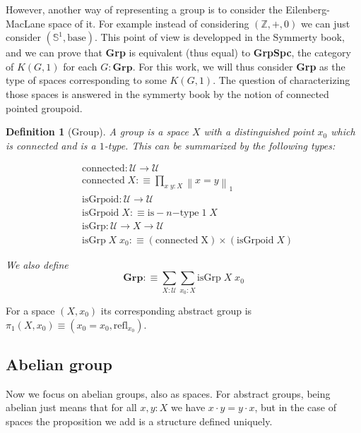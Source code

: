 \documentclass{article}
\newtheorem{defi}{Definition}
\begin{document}
However, another way of representing a group is to consider the Eilenberg-MacLane space of it. For example
instead of considering $(\mathbb Z,+,0)$ we can just consider $(\mathbb S^1,\mathrm{base})$. This point of
view is developped in the Symmerty book, and we can prove that \textbf{Grp} is equivalent (thus equal) to
\textbf{GrpSpc}, the category of $K(G,1)$ for each $G : \textbf{Grp}$. For this work, we will thus consider
\textbf{Grp} as the type of spaces corresponding to some $K(G,1)$. The question of characterizing those spaces
is answered in the symmerty book by the notion of connected pointed groupoid.

\begin{defi}[Group]
    A group is a space $X$ with a distinguished point $x_0$ which is connected and is a $1$-type. This can be
    summarized by the following types:
    
    \begin{align*}
        &\mathrm{connected} : \mathcal U \to \mathcal U\\
        &\mathrm{connected}\;X :\equiv \prod_{x\;y : X} \left\| x = y\right\|_1\\
        &\mathrm{isGrpoid} : \mathcal U \to \mathcal U\\
        &\mathrm{isGrpoid}\;X :\equiv \mathrm{is-}n\mathrm{-type}\;1\;X\\
        &\mathrm{isGrp} : \mathcal U \to X \to \mathcal U\\
        &\mathrm{isGrp}\;X\;x_0 :\equiv (\mathrm{connected\;X})\times(\mathrm{isGrpoid}\;X)
    \end{align*}

    We also define $$\textbf{Grp} :\equiv \sum_{X : \mathcal U}\sum_{x_0 : X} \mathrm{isGrp}\;X\;x_0$$
\end{defi}
    
For a space $(X,x_0)$ its corresponding abstract group is $\pi_1(X,x_0) \equiv (x_0=x_0,\mathrm{refl}_{x_0})$.

\subsection{Abelian group}

Now we focus on abelian groups, also as spaces. For abstract groups, being abelian just means that for all
$x,y : X$ we have $x\cdot y = y\cdot x$, but in the case of spaces the proposition we add is a structure
defined uniquely.
\end{document}
